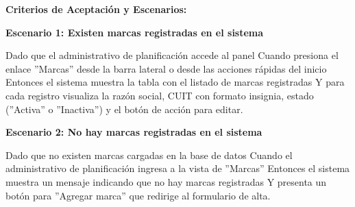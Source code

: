 \documentclass[a4paper,9pt]{article}
\begin{document}
\begin{tcolorbox}[hucard, title={\textbf{HU-239: LISTAR MARCAS} \hfill \scriptsize \colorbox{slatestatus}{\textbf{\ Done\ }} \quad \colorbox{white}{\textcolor{primarydark}{\textbf{\ 2 pts\ }}}}]
{\begin{itemize}[leftmargin=12pt, nosep, itemsep=1.5pt, topsep=1pt]
\end{itemize}
}\par\vspace{3pt}
\noindent\textbf{\footnotesize Criterios de Aceptación y Escenarios:}\par\vspace{2pt}
{\footnotesize
\noindent\textbf{\textcolor{secondarydark}{Escenario 1:  Existen marcas registradas en el sistema}}\par\vspace{1pt}
Dado que el administrativo de planificación accede al panel Cuando presiona el enlace ''Marcas'' desde la barra lateral o desde las acciones rápidas del inicio Entonces el sistema muestra la tabla con el listado de marcas registradas Y para cada registro visualiza la razón social, CUIT con formato insignia, estado (''Activa'' o ''Inactiva'') y el botón de acción para editar.\par\vspace{2.5pt}
\noindent\textbf{\textcolor{secondarydark}{Escenario 2:  No hay marcas registradas en el sistema}}\par\vspace{1pt}
Dado que no existen marcas cargadas en la base de datos Cuando el administrativo de planificación ingresa a la vista de ''Marcas'' Entonces el sistema muestra un mensaje indicando que no hay marcas registradas Y presenta un botón para ''Agregar marca'' que redirige al formulario de alta.\par\vspace{2.5pt}
}\par
\end{tcolorbox}
\end{document}
